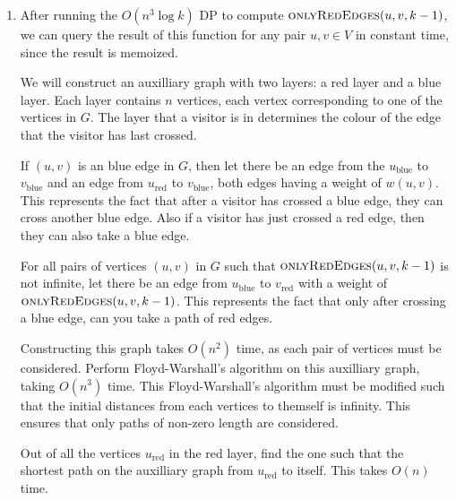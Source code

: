 \documentclass{article}
\begin{document}
\begin{solution}
\begin{enumerate}[label = (\alph*)]
    \pagebreak
    \item 
    After running the $O(n^3 \log k)$ DP to compute $\textsc{onlyRedEdges}(u, v, k-1)$, we can query the result of this function for any pair $u,v\in V$ in constant time, since the result is memoized.

    We will construct an auxilliary graph with two layers: a red layer and a blue layer.
    Each layer contains $n$ vertices, each vertex corresponding to one of the vertices in $G$.
    The layer that a visitor is in determines the colour of the edge that the visitor has last crossed.

    If $(u,v)$ is an blue edge in $G$, then let there be an edge from the 
    $u_{\text{blue}}$ to $v_{\text{blue}}$ and an edge from 
    $u_{\text{red}}$ to $v_{\text{blue}}$, both edges
    having a weight of $w(u,v)$.
    This represents the fact that after a visitor has crossed a blue edge, 
    they can cross another blue edge. 
    Also if a visitor has just crossed a red edge, then they can also take a blue edge.

    For all pairs of vertices $(u,v)$ in $G$ such that $\textsc{onlyRedEdges}(u, v, k-1)$ is not infinite,
    let there be an edge from $u_{\text{blue}}$ to $v_{\text{red}}$ with a 
    weight of $\textsc{onlyRedEdges}(u, v, k-1)$. 
    This represents the fact that only after crossing a blue edge, can you take a path 
    of red edges.

    Constructing this graph takes $O(n^2)$ time, as each pair of vertices must be considered.
    Perform Floyd-Warshall's algorithm on this auxilliary graph, taking $O(n^3)$ time.
    This Floyd-Warshall's algorithm must be modified such that the initial distances from each vertices 
    to themself is infinity. This ensures that only paths of non-zero length are considered.

    Out of all the vertices $u_{\text{red}}$ in the red layer, find the one such that the shortest path 
    on the auxilliary graph from $u_{\text{red}}$ to itself. This takes $O(n)$ time.

\end{enumerate}
\end{solution}
\end{document}
